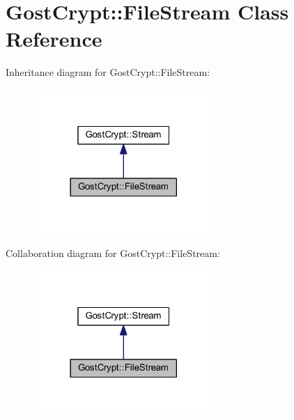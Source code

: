 \hypertarget{class_gost_crypt_1_1_file_stream}{}\section{Gost\+Crypt\+:\+:File\+Stream Class Reference}
\label{class_gost_crypt_1_1_file_stream}


Inheritance diagram for Gost\+Crypt\+:\+:File\+Stream\+:
\nopagebreak
\begin{figure}[H]
\begin{center}
\leavevmode
\includegraphics[width=194pt]{class_gost_crypt_1_1_file_stream__inherit__graph}
\end{center}
\end{figure}


Collaboration diagram for Gost\+Crypt\+:\+:File\+Stream\+:
\nopagebreak
\begin{figure}[H]
\begin{center}
\leavevmode
\includegraphics[width=194pt]{class_gost_crypt_1_1_file_stream__coll__graph}
\end{center}
\end{figure}
